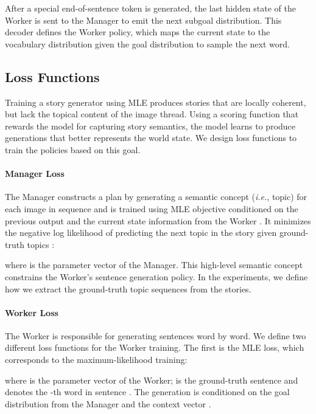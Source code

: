 \documentclass[letterpaper]{article} \usepackage{aaai19}  \usepackage{times}  \usepackage{helvet}  \usepackage{courier}  \usepackage{url}  \usepackage{graphicx}
\begin{document}
After a special end-of-sentence token is generated, the last hidden state  of the Worker is sent to the Manager to emit the next subgoal  distribution. 
This decoder defines the Worker policy,  which maps the current state to the vocabulary distribution given the goal distribution to sample the next word.
\subsection{Loss Functions}
Training a story generator using MLE produces stories that are locally coherent, but lack the topical content of the image thread. Using a scoring function that rewards the model for capturing story semantics, the model learns to produce generations that better represents the world state. We design loss functions to train the policies based on this goal. 

\paragraph{Manager Loss}
The Manager constructs a plan by generating a semantic concept (\emph{i.e.}, topic) for each image in sequence and is trained using MLE objective conditioned on the previous output and the current state information from the Worker . It minimizes the negative log likelihood of predicting the next topic in the story given ground-truth topics :

where  is the parameter vector of the Manager. This high-level semantic concept constrains the Worker's sentence generation policy. In the experiments, we define how we extract the ground-truth topic sequences  from the stories. 
\paragraph{Worker Loss}
The Worker is responsible for generating sentences word by word. We define two different loss functions for the Worker training. The first is the MLE loss, which corresponds to the maximum-likelihood training: 
\begin{adjustbox}{minipage=1.10\linewidth,scale=0.91}
	 
\end{adjustbox}
where  is the parameter vector of the Worker;  is the ground-truth sentence and  denotes the -th word in sentence . The generation is conditioned on the goal distribution  from the Manager and the context vector .  
\end{document}
